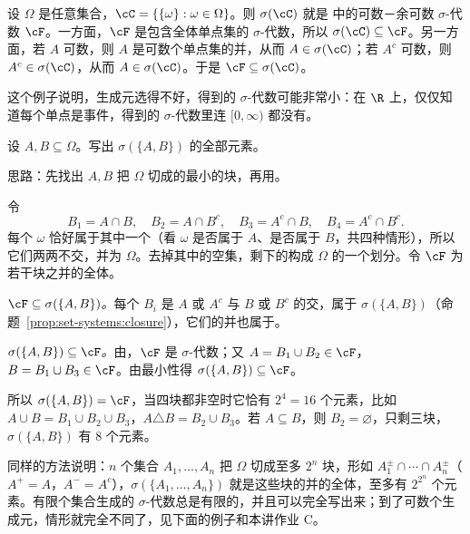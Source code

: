 \begin{example}
设 $\Omega$ 是任意集合，$\cC=\{\{\omega\}:\omega\in\Omega\}$。则 $\sigma(\cC)$ 就是 中的可数－余可数 $\sigma$-代数 $\cF$。一方面，$\cF$ 是包含全体单点集的 $\sigma$-代数，所以 $\sigma(\cC)\subseteq\cF$。另一方面，若 $A$ 可数，则 $A$ 是可数个单点集的并，从而 $A\in\sigma(\cC)$；若 $A^c$ 可数，则 $A^c\in\sigma(\cC)$，从而 $A\in\sigma(\cC)$。于是 $\cF\subseteq\sigma(\cC)$。

这个例子说明，生成元选得不好，得到的 $\sigma$-代数可能非常小：在 $\R$ 上，仅仅知道每个单点是事件，得到的 $\sigma$-代数里连 $[0,\infty)$ 都没有。
\end{example}

\begin{workedexample}\label{we:set-systems:two-sets}
设 $A,B\subseteq\Omega$。写出 $\sigma(\{A,B\})$ 的全部元素。
\end{workedexample}
\begin{solution}
思路：先找出 $A,B$ 把 $\Omega$ 切成的最小的块，再用。

令
\[
B_1=A\cap B,\quad B_2=A\cap B^c,\quad B_3=A^c\cap B,\quad B_4=A^c\cap B^c .
\]
每个 $\omega$ 恰好属于其中一个（看 $\omega$ 是否属于 $A$、是否属于 $B$，共四种情形），所以它们两两不交，并为 $\Omega$。去掉其中的空集，剩下的构成 $\Omega$ 的一个划分。令 $\cF$ 为若干块之并的全体。

\emph{$\cF\subseteq\sigma(\{A,B\})$。}每个 $B_i$ 是 $A$ 或 $A^c$ 与 $B$ 或 $B^c$ 的交，属于 $\sigma(\{A,B\})$（命题~\ref{prop:set-systems:closure}），它们的并也属于。

\emph{$\sigma(\{A,B\})\subseteq\cF$。}由，$\cF$ 是 $\sigma$-代数；又 $A=B_1\cup B_2\in\cF$，$B=B_1\cup B_3\in\cF$。由最小性得 $\sigma(\{A,B\})\subseteq\cF$。

所以 $\sigma(\{A,B\})=\cF$，当四块都非空时它恰有 $2^4=16$ 个元素，比如 $A\cup B=B_1\cup B_2\cup B_3$，$A\triangle B=B_2\cup B_3$。若 $A\subseteq B$，则 $B_2=\varnothing$，只剩三块，$\sigma(\{A,B\})$ 有 $8$ 个元素。

同样的方法说明：$n$ 个集合 $A_1,\dots,A_n$ 把 $\Omega$ 切成至多 $2^n$ 块，形如 $A_1^{\pm}\cap\cdots\cap A_n^{\pm}$（$A^+=A$，$A^-=A^c$），$\sigma(\{A_1,\dots,A_n\})$ 就是这些块的并的全体，至多有 $2^{2^n}$ 个元素。有限个集合生成的 $\sigma$-代数总是有限的，并且可以完全写出来；到了可数个生成元，情形就完全不同了，见下面的例子和本讲作业 C。
\end{solution}

